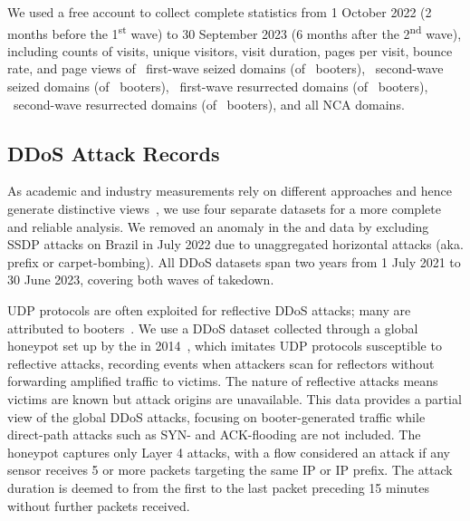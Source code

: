 \documentclass[letterpaper,twocolumn,10pt]{article}
\begin{document}
We used a free account to collect complete statistics from 1 October 2022 (2 months before the 1\textsuperscript{st} wave) to 30 September 2023 (6 months after the 2\textsuperscript{nd} wave), including counts of visits, unique visitors, visit duration, pages per visit, bounce rate, and page views of \BTnFirstWaveSeizedDomainsThatHasSimilarwebTraffic~first-wave seized domains (of \BTnFirstWaveSeizedBooters~booters), \BTnSecondWaveSeizedDomainsThatHasSimilarwebTraffic~second-wave seized domains (of \BTnSecondWaveSeizedBooters~booters), \BTnFirstWaveResurrectedDomainsThatHasSimilarwebTraffic~first-wave resurrected domains (of \BTnFirstWaveResurrectedBooters~booters), \BTnSecondWaveResurrectedDomainsThatHasSimilarwebTraffic~second-wave resurrected domains (of \BTnSecondWaveResurrectedBooters~booters), and all NCA domains.

\subsection{DDoS Attack Records}
As academic and industry measurements rely on different approaches and hence generate distinctive views~\cite{hiesgen2024age,nawrocki2023sok}, we use four separate datasets for a more complete and reliable analysis. We removed an anomaly in the \hopscotch and \amppot data by excluding SSDP attacks on Brazil in July 2022 due to unaggregated horizontal attacks (aka. prefix or carpet-bombing). All DDoS datasets span two years from 1 July 2021 to 30 June 2023, covering both waves of takedown.

 UDP protocols are often exploited for reflective DDoS attacks; many are attributed to booters~\cite{kramer2015amppot,santanna2015booters,krupp2017linking}. We use a DDoS dataset collected through a global honeypot set up by the \ccc in 2014~\cite{thomas20171000}, which imitates UDP protocols susceptible to reflective attacks, recording events when attackers scan for reflectors without forwarding amplified traffic to victims. The nature of reflective attacks means victims are known but attack origins are unavailable. This data provides a partial view of the global DDoS attacks, focusing on booter-generated traffic while direct-path attacks such as SYN- and ACK-flooding are not included. The honeypot captures only Layer 4 attacks, with a flow considered an attack if any sensor receives 5 or more packets targeting the same IP or IP prefix. The attack duration is deemed to from the first to the last packet preceding 15 minutes without further packets received. 
\end{document}
